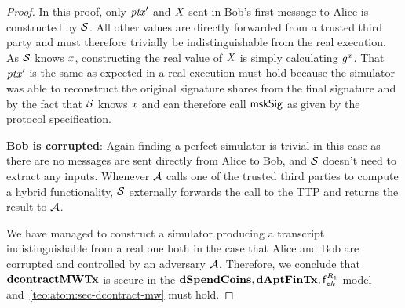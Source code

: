\begin{proof}
    In this proof, only ${\mathit{ptx}}'$ and $\mathit{X}$ sent in Bob's first message to Alice is constructed by $\mathcal{S}$.
    All other values are directly forwarded from a trusted third party and must therefore trivially be indistinguishable from the real execution.
    As $\mathcal{S}$ knows $\mathit{x}$, constructing the real value of $\mathit{X}$ is simply calculating $\mathit{g}^{\mathit{x}}$.
    That ${\mathit{ptx}}'$ is the same as expected in a real execution must hold because the simulator was able to reconstruct the original signature shares from the final signature and by the fact that $\mathcal{S}$ knows $\mathit{x}$ and can therefore call $\mathsf{mskSig}$ as given by the protocol specification.

    \textbf{Bob is corrupted}: Again finding a perfect simulator is trivial in this case as there are no messages are sent directly from Alice to Bob, and $\mathcal{S}$ doesn't need to extract any inputs.
    Whenever $\mathcal{A}$ calls one of the trusted third parties to compute a hybrid functionality, $\mathcal{S}$ externally forwards the call to the TTP and returns the result to $\mathcal{A}$.

    We have managed to construct a simulator producing a transcript indistinguishable from a real one both in the case that Alice and Bob are corrupted and controlled by an adversary $\mathcal{A}$. Therefore, we conclude that $\mathbf{dcontractMWTx}$ is secure in the $\mathbf{dSpendCoins},\mathbf{dAptFinTx},\mathsf{f}^{\mathit{R}_1}_{zk}$-model and~\cref{teo:atom:sec-dcontract-mw} must hold.
\end{proof}
